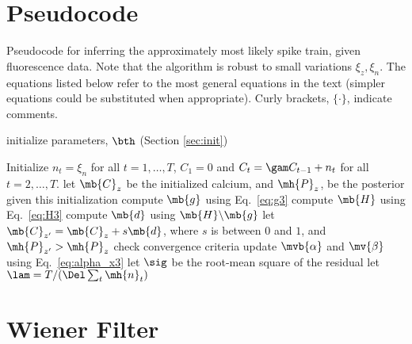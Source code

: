 \newpage
\section{Pseudocode} \label{sec:pseudo}

\begin{algorithm}[h!]
\caption{Pseudocode for inferring the approximately most likely spike train, given fluorescence data. Note that the algorithm is robust to small variations $\xi_z, \xi_n$. The equations listed below refer to the most general equations in the text (simpler equations could be substituted when appropriate).  Curly brackets, $\{ \cdot \}$, indicate comments.}
\label{eqn:pseudocode}
\begin{algorithmic}[1]
\STATE initialize parameters, $\bth$ (Section \ref{sec:init})
	
    \STATE Initialize $n_t=\xi_n$ for all $t=1,\ldots, T$, $C_1=0$ and $C_t = \gam C_{t-1} + n_t$ for all $t=2,\ldots, T$.
	\STATE let $\mb{C}_{z}$ be the initialized calcium, and $\mh{P}_{z}$, be the posterior given this initialization
		\STATE compute $\mb{g}$ using Eq.~\eqref{eq:g3}
		\STATE compute $\mb{H}$ using Eq.~\eqref{eq:H3}
		\STATE compute $\mb{d}$ using $\mb{H} \backslash \mb{g}$ 
		\STATE let $\mb{C}_{z'}=\mb{C}_z + s \mb{d}$, where $s$ is between $0$ and $1$, and $\mh{P}_{z'}>\mh{P}_z$ 
	\ENDWHILE
  \ENDFOR
\STATE check convergence criteria
\STATE update $\mvb{\alpha}$ and $\mv{\beta}$ using Eq.~\eqref{eq:alpha_x3}   
\STATE let $\sig$ be the root-mean square of the residual
\STATE let $\lam=T/(\Del\sum_t \mh{n}_t)$
\ENDWHILE
\end{algorithmic}
\end{algorithm}

\clearpage
\section{Wiener Filter} \label{sec:wiener}

